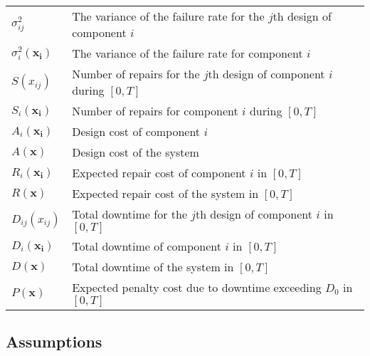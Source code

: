 \documentclass[preprint,12pt]{elsarticle}
\begin{document}
\begin{tabular}{l l}
$\sigma_{ij}^{2}$ & The variance of the failure rate for the $j$th design of component $i$\\
$\sigma_{i}^{2}(\boldsymbol{x_{i}})$ &  The variance of the failure rate for component $i$ \\
$S(x_{ij})$ & Number of repairs for the $j$th design of component $i$ during $[0,T]$\\
$S_{i}(\boldsymbol{x_{i}})$ & Number of repairs for component $i$ during $[0,T]$\\
$A_{i}(\boldsymbol{x_{i}})$  & Design cost of component $i$\\
$A(\boldsymbol{x})$ & Design cost of the system\\
$R_{i}(\boldsymbol{x_{i}})$ & Expected repair cost of component $i$ in $[0, T]$\\
$R(\boldsymbol{x})$ &  Expected repair cost of the system in $[0, T]$\\
$D_{ij}(x_{ij})$ & Total downtime for the $j$th design of component $i$ in $[0, T]$\\
$D_{i}(\boldsymbol{x_{i}})$& Total downtime of component $i$ in $[0, T]$\\
$D(\boldsymbol{x})$ & Total downtime of the system in $[0, T]$\\
$P(\boldsymbol{x})$ & Expected penalty cost due to downtime exceeding $D_{0}$ in $[0, T]$\\

	\end{tabular}
	 \subsection{Assumptions}
	
\end{document}
